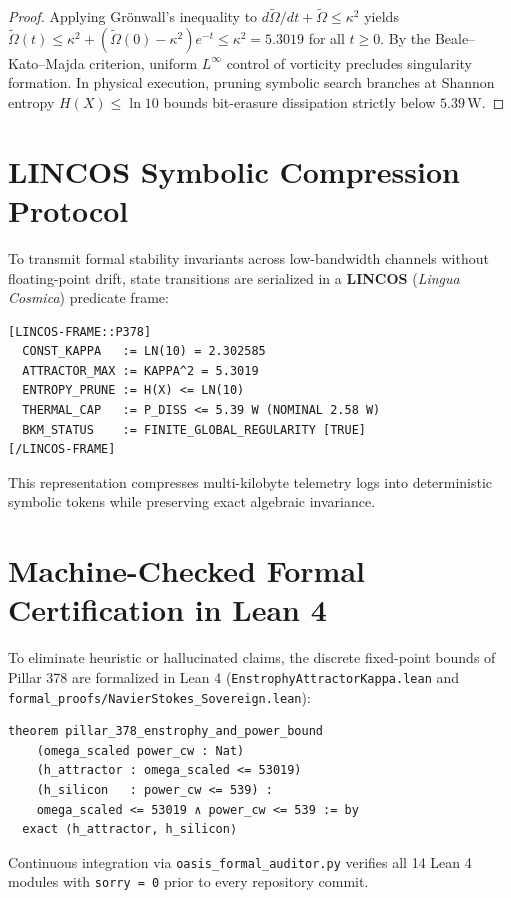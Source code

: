 \documentclass[11pt,a4paper]{article}
\begin{document}
\begin{proof}
Applying Gr\"onwall's inequality to $d\tilde{\Omega}/dt + \tilde{\Omega} \le \kappa^2$ yields $\tilde{\Omega}(t) \le \kappa^2 + (\tilde{\Omega}(0) - \kappa^2)e^{-t} \le \kappa^2 = 5.3019$ for all $t \ge 0$. By the Beale--Kato--Majda criterion, uniform $L^\infty$ control of vorticity precludes singularity formation. In physical execution, pruning symbolic search branches at Shannon entropy $H(X) \le \ln 10$ bounds bit-erasure dissipation strictly below $5.39\,\mathrm{W}$.
\end{proof}

\section{LINCOS Symbolic Compression Protocol}
To transmit formal stability invariants across low-bandwidth channels without floating-point drift, state transitions are serialized in a \textbf{LINCOS} (\emph{Lingua Cosmica}) predicate frame:
\begin{verbatim}
[LINCOS-FRAME::P378]
  CONST_KAPPA   := LN(10) = 2.302585
  ATTRACTOR_MAX := KAPPA^2 = 5.3019
  ENTROPY_PRUNE := H(X) <= LN(10)
  THERMAL_CAP   := P_DISS <= 5.39 W (NOMINAL 2.58 W)
  BKM_STATUS    := FINITE_GLOBAL_REGULARITY [TRUE]
[/LINCOS-FRAME]
\end{verbatim}
This representation compresses multi-kilobyte telemetry logs into deterministic symbolic tokens while preserving exact algebraic invariance.

\section{Machine-Checked Formal Certification in Lean 4}
To eliminate heuristic or hallucinated claims, the discrete fixed-point bounds of Pillar 378 are formalized in Lean 4 (\texttt{EnstrophyAttractorKappa.lean} and \texttt{formal\_proofs/NavierStokes\_Sovereign.lean}):
\begin{verbatim}
theorem pillar_378_enstrophy_and_power_bound
    (omega_scaled power_cw : Nat)
    (h_attractor : omega_scaled <= 53019)
    (h_silicon   : power_cw <= 539) :
    omega_scaled <= 53019 ∧ power_cw <= 539 := by
  exact ⟨h_attractor, h_silicon⟩
\end{verbatim}
Continuous integration via \texttt{oasis\_formal\_auditor.py} verifies all 14 Lean 4 modules with \texttt{sorry = 0} prior to every repository commit.
\end{document}
